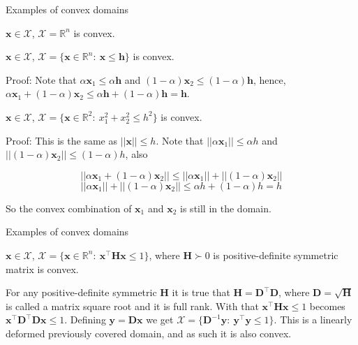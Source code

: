 \documentclass{beamer}
\begin{document}
\begin{frame}{Examples of convex domains}
\begin{flushleft}

$\mathbf{x} \in \mathcal{X}$, $\mathcal{X} = \mathbb{R}^n$  is convex.

\bigskip

$\mathbf{x} \in \mathcal{X}$, $\mathcal{X} = \{ \mathbf{x} \in \mathbb{R}^n: \ \mathbf{x} \leq \mathbf{h} \}$ is convex.

\bigskip

Proof: Note that $\alpha \mathbf{x}_1 \leq \alpha \mathbf{h}$ and $(1 - \alpha) \mathbf{x}_2 \leq (1 - \alpha) \mathbf{h}$, hence, $\alpha \mathbf{x}_1 + (1 - \alpha) \mathbf{x}_2 \leq 
\alpha \mathbf{h} + (1 - \alpha) \mathbf{h} = \mathbf{h}$. \qedsymbol
 
\bigskip
 
$\mathbf{x} \in \mathcal{X}$, $\mathcal{X} = \{ \mathbf{x} \in \mathbb{R}^2: \ x_1^2+x_2^2 \leq h^2 \}$ is convex.
 
\bigskip

Proof: This is the same as $|| \mathbf{x} || \leq h$. Note that $|| \alpha \mathbf{x}_1 || \leq \alpha h$ and $|| (1 - \alpha) \mathbf{x}_2 || \leq (1 - \alpha) h$, also 

$$|| \alpha \mathbf{x}_1 + (1 - \alpha) \mathbf{x}_2 || \leq || \alpha \mathbf{x}_1 || + || (1 - \alpha) \mathbf{x}_2 ||$$
$$|| \alpha \mathbf{x}_1 || + || (1 - \alpha) \mathbf{x}_2 || \leq \alpha h + (1 - \alpha) h = h$$ 

So the convex combination of $\mathbf{x}_1$ and $\mathbf{x}_2$ is still in the domain. \qedsymbol
 
 
\end{flushleft}
\end{frame}






\begin{frame}{Examples of convex domains}
	\begin{flushleft}
		
		$\mathbf{x} \in \mathcal{X}$, $\mathcal{X} = \{ \mathbf{x} \in \mathbb{R}^n: \ \mathbf{x}^\top \mathbf{H} \mathbf{x} \leq 1 \}$, where $\mathbf{H} \succ 0$ is positive-definite symmetric matrix is convex. 
		
		\bigskip
		
		For any positive-definite symmetric $\mathbf{H}$ it is true that $\mathbf{H} = \mathbf{D}^\top\mathbf{D}$, where $\mathbf{D} = \sqrt{\mathbf{H}}$ is called a matrix square root and it is full rank. With that $\mathbf{x}^\top \mathbf{H} \mathbf{x} \leq 1$ becomes $\mathbf{x}^\top \mathbf{D}^\top\mathbf{D} \mathbf{x} \leq 1$. Defining $\mathbf{y} = \mathbf{D} \mathbf{x}$ we get $\mathcal{X} = \{ \mathbf{D}^{-1}\mathbf{y}: \ \mathbf{y}^\top \mathbf{y} \leq 1 \}$. This is a linearly deformed previously covered domain, and as such it is also convex.
		
	\end{flushleft}
\end{frame}
\end{document}
